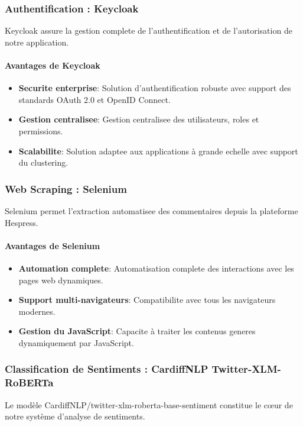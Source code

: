 \subsubsection{Authentification : Keycloak}
Keycloak assure la gestion complete de l'authentification et de l'autorisation de notre application.

\paragraph{Avantages de Keycloak}
\begin{itemize}
    \item \textbf{Securite enterprise}: Solution d'authentification robuste avec support des standards OAuth 2.0 et OpenID Connect.
    \item \textbf{Gestion centralisee}: Gestion centralisee des utilisateurs, roles et permissions.
    \item \textbf{Scalabilite}: Solution adaptee aux applications à grande echelle avec support du clustering.
\end{itemize}

\subsubsection{Web Scraping : Selenium}
Selenium permet l'extraction automatisee des commentaires depuis la plateforme Hespress.

\paragraph{Avantages de Selenium}
\begin{itemize}
    \item \textbf{Automation complete}: Automatisation complete des interactions avec les pages web dynamiques.
    \item \textbf{Support multi-navigateurs}: Compatibilite avec tous les navigateurs modernes.
    \item \textbf{Gestion du JavaScript}: Capacite à traiter les contenus generes dynamiquement par JavaScript.
\end{itemize}

\subsubsection{Classification de Sentiments : CardiffNLP Twitter-XLM-RoBERTa}
Le modèle CardiffNLP/twitter-xlm-roberta-base-sentiment constitue le cœur de notre système d'analyse de sentiments.

